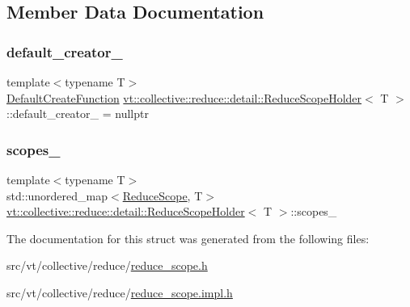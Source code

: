 \subsection{Member Data Documentation}
\mbox{\label{structvt_1_1collective_1_1reduce_1_1detail_1_1_reduce_scope_holder_abd3a6a6a1eda5083b97348c16ef58858}} 
\subsubsection{\texorpdfstring{default\+\_\+creator\+\_\+}{default\_creator\_}}
{\footnotesize\ttfamily template$<$typename T$>$ \\
\hyperlink{structvt_1_1collective_1_1reduce_1_1detail_1_1_reduce_scope_holder_ac1bca1874a023b11bdc3c26b165c3b20}{Default\+Create\+Function} \hyperlink{structvt_1_1collective_1_1reduce_1_1detail_1_1_reduce_scope_holder}{vt\+::collective\+::reduce\+::detail\+::\+Reduce\+Scope\+Holder}$<$ T $>$\+::default\+\_\+creator\+\_\+ = nullptr\hspace{0.3cm}{\ttfamily [private]}}

\mbox{\label{structvt_1_1collective_1_1reduce_1_1detail_1_1_reduce_scope_holder_a71e4ba9dc78528dd93e253f4ff24e0e4}} 
\subsubsection{\texorpdfstring{scopes\+\_\+}{scopes\_}}
{\footnotesize\ttfamily template$<$typename T$>$ \\
std\+::unordered\+\_\+map$<$\hyperlink{structvt_1_1collective_1_1reduce_1_1detail_1_1_reduce_scope}{Reduce\+Scope}, T$>$ \hyperlink{structvt_1_1collective_1_1reduce_1_1detail_1_1_reduce_scope_holder}{vt\+::collective\+::reduce\+::detail\+::\+Reduce\+Scope\+Holder}$<$ T $>$\+::scopes\+\_\+\hspace{0.3cm}{\ttfamily [private]}}



The documentation for this struct was generated from the following files\+:\begin{DoxyCompactItemize}
\item 
src/vt/collective/reduce/\hyperlink{reduce__scope_8h}{reduce\+\_\+scope.\+h}\item 
src/vt/collective/reduce/\hyperlink{reduce__scope_8impl_8h}{reduce\+\_\+scope.\+impl.\+h}\end{DoxyCompactItemize}
